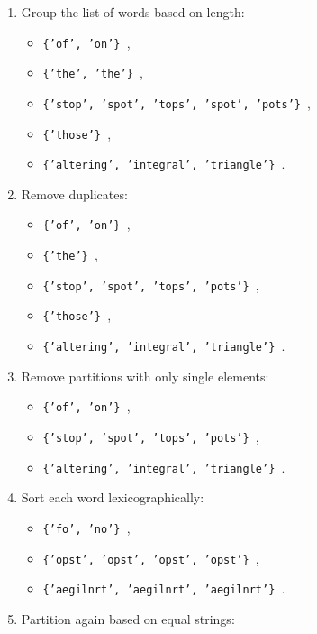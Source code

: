 \documentclass[12pt,twoside]{article}
\begin{document}
\begin{problems}
\begin{problemparts}
\problempart \begin{enumerate}
    \item Group the list of words based on length:
        \begin{itemize}
            \item {\tt \{'of', 'on'\} },
            \item {\tt \{'the', 'the'\} },
            \item {\tt \{'stop', 'spot', 'tops', 'spot', 'pots'\} },
            \item {\tt \{'those'\} },
            \item {\tt \{'altering', 'integral', 'triangle'\} }.
        \end{itemize}
    \item Remove duplicates:
        \begin{itemize}
            \item {\tt \{'of', 'on'\} },
            \item {\tt \{'the'\} },
            \item {\tt \{'stop', 'spot', 'tops', 'pots'\} },
            \item {\tt \{'those'\} },
            \item {\tt \{'altering', 'integral', 'triangle'\} }.
        \end{itemize}
    \item Remove partitions with only single elements: 
        \begin{itemize}
            \item {\tt \{'of', 'on'\} },
            \item {\tt \{'stop', 'spot', 'tops', 'pots'\} },
            \item {\tt \{'altering', 'integral', 'triangle'\} }.
        \end{itemize}
    \item Sort each word lexicographically:
        \begin{itemize}
            \item {\tt \{'fo', 'no'\} },
            \item {\tt \{'opst', 'opst', 'opst', 'opst'\} },
            \item {\tt \{'aegilnrt', 'aegilnrt', 'aegilnrt'\} }.
        \end{itemize}
    \item Partition again based on equal strings:
        \begin{itemize}

\end{itemize}
\end{enumerate}
\end{problemparts}
\end{problems}
\end{document}
